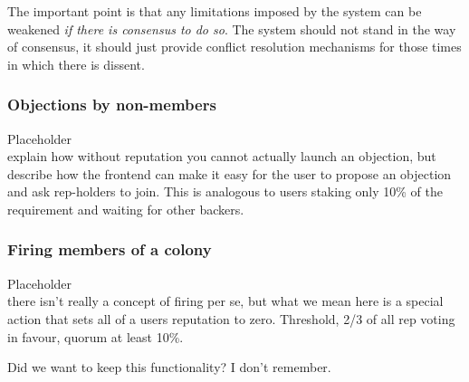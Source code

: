 The important point is that any limitations imposed by the system can be weakened \emph{if there is consensus to do so}. The system should not stand in the way of consensus, it should just provide conflict resolution mechanisms for those times in which there is dissent.


\subsubsection{Objections by non-members}
%
Placeholder\\
explain how without reputation you cannot actually launch an objection, but describe how the frontend can make it easy for the user to propose an objection and ask rep-holders to join. This is analogous to users staking only 10\% of the requirement and waiting for other backers.
%

\subsubsection{Firing members of a colony}

%
Placeholder\\
there isn't really a concept of firing per se, but what we mean here is a special action that sets all of a users reputation to zero.
Threshold, 2/3 of all rep voting in favour, quorum at least 10\%. 
%

Did we want to keep this functionality? I don't remember.

